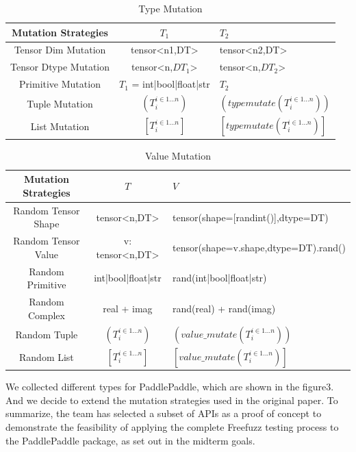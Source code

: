 \documentclass[sigconf]{acmart}
\begin{document}
  \begin{table}[h]
    \centering
    \caption{Type Mutation}
    \label{tab:freq}
    \begin{tabular}{ccl}
      \toprule
      Mutation Strategies&$T_1$&$T_2$\\
      \midrule
      Tensor Dim Mutation & tensor<n1,DT>& tensor<n2,DT>\\
      Tensor Dtype Mutation & tensor<n,$DT_1$>& tensor<n,$DT_2$>\\
      Primitive Mutation & $T_1$ = int|bool|float|str & $T_2$\\
      Tuple Mutation & $(T_i ^ {i\in 1...n})$&$(typemutate(T_i ^ {i\in 1...n}))$ \\
      List Mutation & $[T_i ^ {i\in 1...n}]$&$[typemutate(T_i ^ {i\in 1...n})]$ \\
    \bottomrule
  \end{tabular}
  \end{table}

  \begin{table}[h]
    \centering
    \caption{Value Mutation}
    \label{tab:freq}
    \begin{tabular}{ccl}
      \toprule
      Mutation Strategies&$T$&$V$\\
      \midrule
      Random Tensor Shape& tensor<n,DT>& tensor(shape=[randint()],dtype=DT)\\
      Random Tensor Value& v: tensor<n,DT>& tensor(shape=v.shape,dtype=DT).rand()\\
      Random Primitive& int|bool|float|str & rand(int|bool|float|str)\\
      Random Complex& real + imag & rand(real) + rand(imag)\\
      Random Tuple& $(T_i ^ {i\in 1...n})$&$(value\_mutate(T_i ^ {i\in 1...n}))$ \\
      Random List& $[T_i ^ {i\in 1...n}]$&$[value\_mutate(T_i ^ {i\in 1...n})]$ \\
    \bottomrule
  \end{tabular}
  \end{table}


  We collected different types for PaddlePaddle, which are shown in the figure3. 
  And we decide to extend the mutation strategies used in the original paper.
  To summarize, the team has selected a subset of APIs as a proof of concept to 
  demonstrate the feasibility of applying the complete Freefuzz testing process to the PaddlePaddle package, 
  as set out in the midterm goals.
\end{document}
